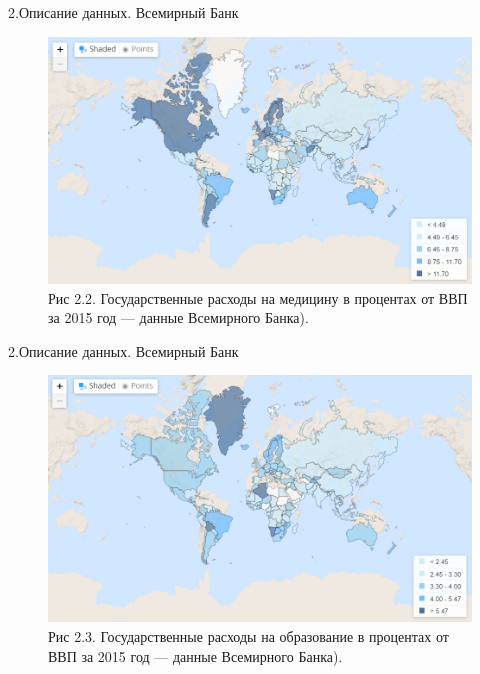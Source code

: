 \documentclass[aspectratio=169]{beamer}
\begin{document}
\begin{frame}{2.Описание данных. Всемирный Банк}
\begin{figure} \label{hompic}
            \centering
            \includegraphics[scale=0.3]{medicine.png}
            \caption{Рис 2.2. Государственные расходы на медицину в процентах от ВВП  за 2015 год --- данные Всемирного Банка).}
            
        \end{figure}
\end{frame}

\begin{frame}{2.Описание данных. Всемирный Банк}
\begin{figure} \label{hompic}
            \centering
            \includegraphics[scale=0.3]{education.png}
            \caption{Рис 2.3. Государственные расходы на образование в процентах от ВВП за 2015 год --- данные Всемирного Банка).}
            
        \end{figure}
\end{frame}
\end{document}
